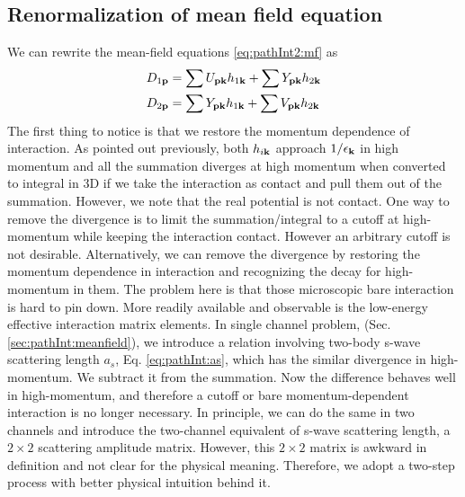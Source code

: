 \subsection {Renormalization of mean field equation}
We can rewrite the mean-field equations \ref{eq:pathInt2:mf} as 
\begin{align}
D_{1\mathbf{p}}&=\sum{}U_{\mathbf{p}\mathbf{k}}h_{1\mathbf{k}}+\sum{}Y_{\mathbf{p}\mathbf{k}}h_{2\mathbf{k}}\label{eq:pathInt2:mfopen}\\
D_{2\mathbf{p}}&=\sum{}Y_{\mathbf{p}\mathbf{k}}h_{1\mathbf{k}}+\sum{}V_{\mathbf{p}\mathbf{k}}h_{2\mathbf{k}}\label{eq:pathInt2:mfclose}
\end{align}
The first thing to notice is that we restore the momentum dependence of interaction.  As pointed out previously, both $h_{i\mathbf{k}}$ approach $1/\epsilon_{\mathbf{k}}$ in high momentum and all the summation diverges at high momentum when converted to integral in 3D if we take the interaction as contact and pull them out of the summation.  However, we note that the real potential is not contact.  One way to remove the divergence is to  limit the summation/integral to a cutoff at high-momentum while keeping the interaction contact.  However an arbitrary cutoff is not desirable.  Alternatively, we can remove the divergence by restoring the momentum dependence in interaction and recognizing the decay for high-momentum in them.  The problem here is that those microscopic bare interaction is hard to pin down.      More readily available and observable is the low-energy effective interaction matrix elements.             In single channel problem, (Sec. \ref{sec:pathInt:meanfield}),  we  introduce a relation involving two-body s-wave scattering length $a_{s}$, Eq. \eqref{eq:pathInt:as}, which has the similar divergence in high-momentum.  We subtract it from the summation.  Now the difference behaves well in high-momentum,  and therefore a cutoff or bare momentum-dependent interaction is no longer necessary.  In principle, we can do the same in two channels and introduce the two-channel equivalent of s-wave scattering length, a $2\times2$ scattering amplitude matrix.  However, this $2\times2$ matrix is awkward in definition and not clear for the physical meaning.   Therefore, we adopt a two-step process with better physical intuition behind it.   

